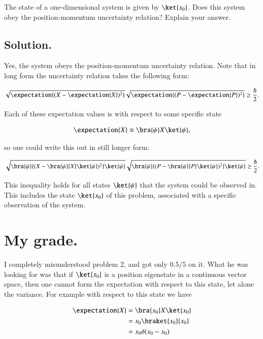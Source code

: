 The state of a one-dimensional system is given by $\ket{x_0}$. Does this system obey the position-momentum uncertainty relation? Explain your answer.

\subsection{Solution.}

Yes, the system obeys the position-momentum uncertainty relation.  Note that in long form the uncertainty relation takes the following form:

\begin{align}\label{eqn:qmIproblemSet1:8}
\sqrt{\expectation{ (X - \expectation{X})^2 }}
\sqrt{\expectation{ (P - \expectation{P})^2 }} \ge \frac{\hbar}{2}.
\end{align}

Each of these expectation values is with respect to some specific state

\begin{align}\label{eqn:qmIproblemSet1:7}
\expectation{ X } \equiv \bra{\psi} X \ket{\psi},
\end{align}

so one could write this out in still longer form:

\begin{align}\label{eqn:qmIproblemSet1:8b}
\sqrt{\bra{\psi}{ (X - \bra{\psi}{X}\ket{\psi})^2 } \ket{\psi} }
\sqrt{\bra{\psi}{ (P - \bra{\psi}{P}\ket{\psi})^2 } \ket{\psi} } \ge \frac{\hbar}{2}.
\end{align}

This inequality holds for all states $\ket{\psi}$ that the system could be observed in.  This includes the state $\ket{x_0}$ of this problem, associated with a specific observation of the system.

\section{My grade.}

I completely misunderstood problem 2, and got only $0.5/5$ on it.  What he was looking for was that if $\ket{x_0}$ is a position eigenstate in a continuous vector space, then one cannot form the expectation with respect to this state, let alone the variance.  For example with respect to this state we have

\begin{align*}
\expectation{X} 
&= \bra{x_0} X \ket{x_0} \\
&= x_0 \braket{x_0}{x_0} \\
&= x_0 \delta(x_0 - x_0)
\end{align*}

